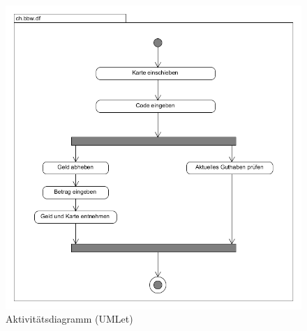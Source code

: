 \documentclass[a4paper, titlepage]{scrartcl}
\begin{document}
    \begin{figure}
        \includegraphics[width=\textwidth]{Aktivitaetsdiagramm1b.png}
        \caption{Aktivitätsdiagramm (UMLet)}
        \label{AktivitaetsdiagrammUmlet}
    \end{figure}
    
\end{document}
